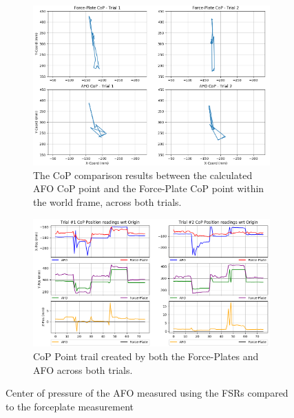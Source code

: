 \begin{figure}[h!]
    \centering
    \begin{subfigure}{0.5\linewidth}
        \captionsetup{justification=centering}
        \centerline{ \includegraphics[scale=0.35]{images/mech_design/SoleSensorV3_CoPComparison_2D_XYplane.png}}
        \caption[CoP comparison]{The CoP comparison results between the calculated AFO CoP point and the Force-Plate CoP point within the world frame, across both trials.}
        \label{fig:3DFSRCoP}
    \end{subfigure}%
    \vspace{1cm}
    \begin{subfigure}{.5\linewidth}
        \captionsetup{justification=centering}
        \centerline{\includegraphics[scale=0.35]{images/mech_design/SoleSensorV3_CoPComparison_BothTrials.png}}
        \caption[CoP Point Trail ]{CoP Point trail created by both the Force-Plates and AFO across both trials. }
        \label{fig:FSRCoPAFO}
    \end{subfigure}%
    \caption[Center of Pressure of the AFO]{Center of pressure of the AFO measured using the FSRs compared to the forceplate measurement \cite{Michaels2020}}
    \label{fig:CoPAFO}
\end{figure}



